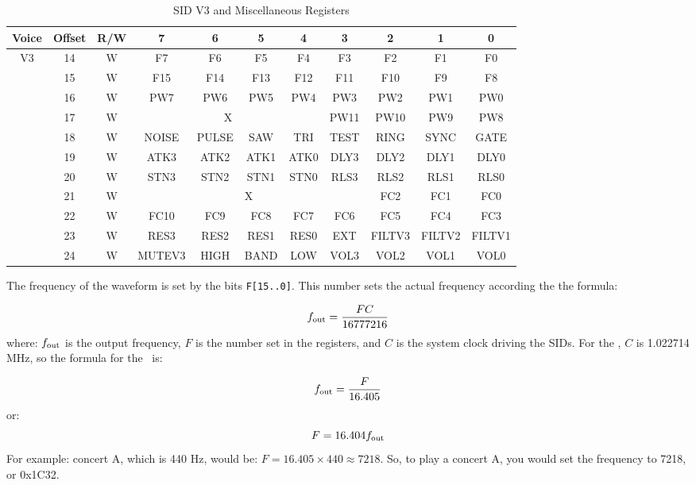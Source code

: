 \begin{table}[ht]
	\begin{center}
		\begin{tabular}{|c|c|c|c|c|c|c|c|c|c|c|} \hline
			Voice & Offset & R/W & 7 & 6 & 5 & 4 & 3 & 2 & 1 & 0 \\ \hline\hline
            \multirow{7}{*}{V3} & 14 & W & F7 & F6 & F5 & F4 & F3 & F2 & F1 & F0 \\ \cline{2-11}
            & 15 & W & F15 & F14 & F13 & F12 & F11 & F10 & F9 & F8 \\ \cline{2-11}
            & 16 & W & PW7 & PW6 & PW5 & PW4 & PW3 & PW2 & PW1 & PW0 \\ \cline{2-11}
            & 17 & W & \multicolumn{4}{|c|}{X} & PW11 & PW10 & PW9 & PW8 \\ \cline{2-11}
            & 18 & W & NOISE & PULSE & SAW & TRI & TEST & RING & SYNC & GATE \\ \cline{2-11}
            & 19 & W & ATK3 & ATK2 & ATK1 & ATK0 & DLY3 & DLY2 & DLY1 & DLY0 \\ \cline{2-11}
            & 20 & W & STN3 & STN2 & STN1 & STN0 & RLS3 & RLS2 & RLS1 & RLS0 \\ \hline\hline

            \multirow{4}{*}{} & 21 & W & \multicolumn{5}{|c|}{X} & FC2 & FC1 & FC0 \\ \cline{2-11}
            & 22 & W & FC10 & FC9 & FC8 & FC7 & FC6 & FC5 & FC4 & FC3 \\ \cline{2-11}
            & 23 & W & RES3 & RES2 & RES1 & RES0 & EXT & FILTV3 & FILTV2 & FILTV1 \\ \cline{2-11}
            & 24 & W & MUTEV3 & HIGH & BAND & LOW & VOL3 & VOL2 & VOL1 & VOL0 \\ \hline
		\end{tabular}
	\end{center}
	\caption{SID V3 and Miscellaneous Registers}
	\label{tab:sid_registers_v3_global}
\end{table}

The frequency of the waveform is set by the bits \verb+F[15..0]+. This number sets the actual frequency according the the formula:

\[
f_{\rm out} = \frac{FC}{16777216}
\]
where: $f_{\rm out}$ is the output frequency, $F$ is the number set in the registers, and $C$ is the system clock driving the SIDs. For the \jr, $C$ is 1.022714 MHz, so the formula for the \jr\ is:

\[
f_{\rm out} = \frac{F}{16.405}
\]
or:
\[
F = 16.404f_{\rm out}
\]
For example: concert A, which is 440 Hz, would be: $F = 16.405 \times 440 \approx 7218$. So, to play a concert A, you would set the frequency to 7218, or 0x1C32.

